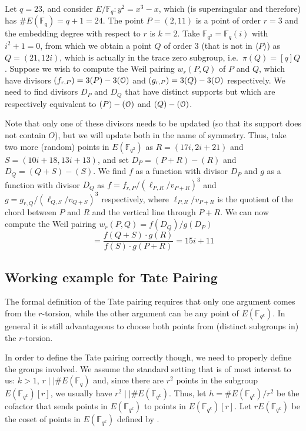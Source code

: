 \begin{example}
Let $q = 23$, and consider $E/\mathbb{F}_q : y^2 = x^3 - x$, which (is supersingular and therefore) has $\#E(\mathbb{F}_q) = q + 1 = 24$. The point $P = (2, 11)$ is a point of order $r = 3$ and the embedding degree with respect to $r$ is $k = 2$. Take $\mathbb{F}_{q^2} = \mathbb{F}_q(i)$ with $i^2 + 1 = 0$, from which we obtain a point $Q$ of order 3 (that is not in $\langle P \rangle$) as $Q = (21, 12i)$, which is actually in the trace zero subgroup, i.e.\ $\pi(Q) = [q]Q$. Suppose we wish to compute the Weil pairing $w_r(P, Q)$ of $P$ and $Q$, which have divisors $(f_{r,P}) = 3(P) - 3(\EuScript{O})$ and $(g_{r,P}) = 3(Q) - 3(\EuScript{O})$ respectively. We need to find divisors $D_P$ and $D_Q$ that have distinct supports but which are respectively equivalent to $(P) - (\EuScript{O})$ and $(Q) - (\EuScript{O})$. 

Note that only one of these divisors needs to be updated (so that its support does not contain $O$), but we will update both in the name of symmetry. Thus, take two more (random) points in $E(\mathbb{F}_{q^2})$ as $R = (17i, 2i + 21)$ and $S = (10i + 18, 13i + 13)$, and set $D_P = (P + R) - (R)$ and $D_Q = (Q + S) - (S)$. We find $f$ as a function with divisor $D_P$ and $g$ as a function with divisor $D_Q$ as $f = f_{r,P}/(\ell_{P,R}/v_{P+R})^3$ and $g = g_{r,Q}/(\ell_{Q,S}/v_{Q+S})^3$ respectively, where $\ell_{P,R}/v_{P+R}$ is the quotient of the chord between $P$ and $R$ and the vertical line through $P + R$. We can now compute the Weil pairing $w_r(P, Q) = f(D_Q)/g(D_P)$
$$= \frac{f(Q + S) \cdot g(R)}{f(S) \cdot g(P + R)} = 15i + 11 $$
\label{example:weilparingsage}
\end{example}



\subsection{Working example for Tate Pairing}
\label{ssec:ch2.tatepairing}

The formal definition of the Tate pairing requires that only one argument comes
from the $r$-torsion, while the other argument can be any point of $E(\mathbb{F}_{q^k})$. In general it is still advantageous to choose both points from (distinct subgroups in) the $r$-torsion.

In order to define the Tate pairing correctly though, we need to properly define the groups involved. We assume the standard setting that is of most interest to us: $k > 1$, $r \mid \mid\#E(\mathbb{F}_q)$ and, since there are $r^2$ points in the subgroup $E(\mathbb{F}_{q^k})[r]$, we usually have $r^2 \mid \mid \#E(\mathbb{F}_{q^k})$. Thus, let $h = \#E(\mathbb{F}_{q^k})/r^2$ be the cofactor that sends points in $E(\mathbb{F}_{q^k})$ to points in $E(\mathbb{F}_{q^k})[r]$. Let $rE(\mathbb{F}_{q^k})$ be the coset of points in $E(\mathbb{F}_{q^k})$ defined by .


